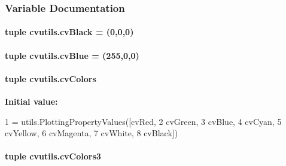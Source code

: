 \subsubsection{Variable Documentation}
\hypertarget{namespacecvutils_a43328b65912125accda8093b36b70c4c}{
\paragraph[{cv\-Black}]{\setlength{\rightskip}{0pt plus 5cm}tuple cvutils.\-cv\-Black = (0,0,0)}}\label{namespacecvutils_a43328b65912125accda8093b36b70c4c}
\hypertarget{namespacecvutils_a21f2d3986a080f8ffba966c404883ec3}{
\paragraph[{cv\-Blue}]{\setlength{\rightskip}{0pt plus 5cm}tuple cvutils.\-cv\-Blue = (255,0,0)}}\label{namespacecvutils_a21f2d3986a080f8ffba966c404883ec3}
\hypertarget{namespacecvutils_aaab6eff7b41ecfffa29df473eaef1745}{
\paragraph[{cv\-Colors}]{\setlength{\rightskip}{0pt plus 5cm}tuple cvutils.\-cv\-Colors}}\label{namespacecvutils_aaab6eff7b41ecfffa29df473eaef1745}
{\bfseries Initial value\-:}
\begin{DoxyCode}
1 = utils.PlottingPropertyValues([cvRed,
2                                          cvGreen,
3                                          cvBlue,
4                                          cvCyan,
5                                          cvYellow,
6                                          cvMagenta,
7                                          cvWhite,
8                                          cvBlack])
\end{DoxyCode}
\hypertarget{namespacecvutils_a29efe4a75fb1c40988443f215647998f}{
\paragraph[{cv\-Colors3}]{\setlength{\rightskip}{0pt plus 5cm}tuple cvutils.\-cv\-Colors3}}\label{namespacecvutils_a29efe4a75fb1c40988443f215647998f}
